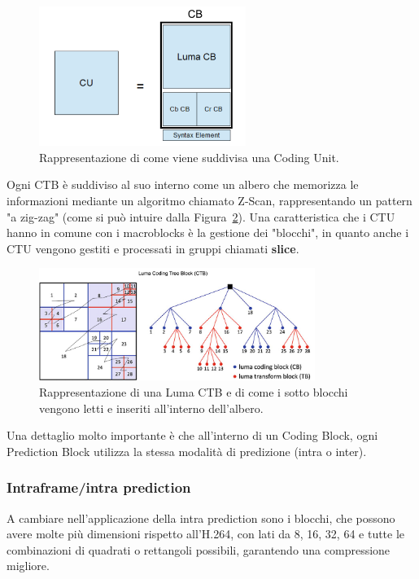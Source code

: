 \documentclass[a4paper,12pt, oneside]{article}
\begin{document}
 \begin{figure}[h]
    \centering
    \includegraphics[width=0.6\textwidth]{images/coding-unit.png}
    \caption{Rappresentazione di come viene suddivisa una Coding Unit.}
    \label{fig:coding_unit}
\end{figure}

 \noindent Ogni CTB è suddiviso al suo interno come un albero che memorizza le informazioni mediante un algoritmo
chiamato Z-Scan, rappresentando un pattern "a zig-zag" (come si può intuire dalla
Figura~\ref{fig:chroma_CTB}).
Una caratteristica che i CTU hanno in comune con i macroblocks è la gestione dei "blocchi",
in quanto anche i CTU vengono gestiti e processati in gruppi chiamati \textbf{slice}.

\begin{figure}[h]
    \centering
    \includegraphics[width=0.8\textwidth]{images/chroma-CTB.png}
    \caption{Rappresentazione di una Luma CTB e di come i sotto blocchi vengono letti e inseriti
    all'interno dell'albero.}
    \label{fig:chroma_CTB}
\end{figure}

Una dettaglio molto importante è che all'interno di un Coding Block, ogni Prediction Block utilizza la
stessa modalità di predizione (intra o inter).

\subsubsection{Intraframe/intra prediction}
A cambiare nell'applicazione della intra prediction sono i blocchi, che possono avere molte più
dimensioni rispetto all'H.264, con lati da 8, 16, 32, 64 e tutte le combinazioni di quadrati o rettangoli
possibili, garantendo una compressione migliore.
\end{document}
